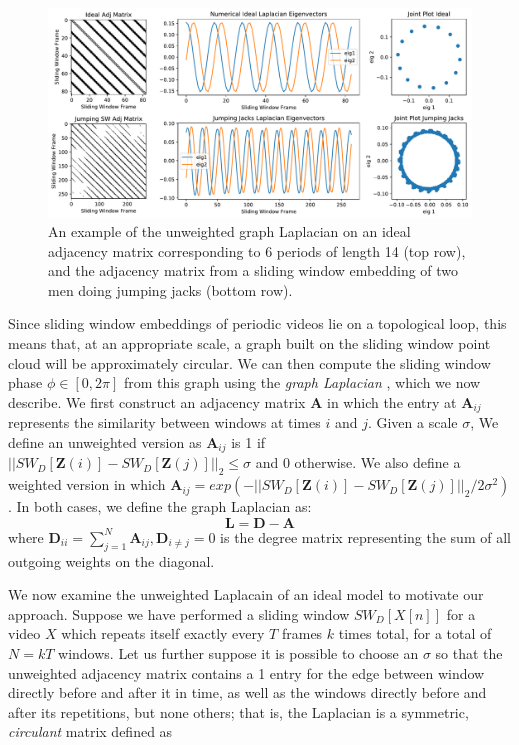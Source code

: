 \documentclass{article}
\newcommand{\mb}{\mathbf}
\begin{document}
\begin{figure}[h!]
\centering
\includegraphics[width=\columnwidth]{CirculantExample.pdf}
\caption{An example of the unweighted graph Laplacian on an ideal adjacency matrix corresponding to 6 periods of length 14 (top row), and the adjacency matrix from a sliding window embedding of two men doing jumping jacks (bottom row).  }
\label{fig:CirculantExample}
\end{figure}

Since sliding window embeddings of periodic videos lie on a topological loop, this means that, at an appropriate scale, a graph built on the sliding window point cloud will be approximately circular.  We can then compute the sliding window phase $\phi \in [0, 2\pi]$ from this graph using the {\em graph Laplacian} \cite{chung1997spectral}, which we now describe. We first construct an adjacency matrix $\mb{A}$ in which the entry at $\mb{A}_{ij}$ represents the similarity between windows at times $i$ and $j$.  Given a scale $\sigma$, We define an unweighted version as $\mb{A}_{ij}$ is 1 if $||SW_{D}[\mb{Z}(i)] - SW_{D}[\mb{Z}(j)]||_2 \leq \sigma$ and 0 otherwise. We also define a weighted version in which $\mb{A}_{ij} = exp(-||SW_{D}[\mb{Z}(i)] - SW_{D}[\mb{Z}(j)]||_2/2\sigma^2)$. In both cases, we define the graph Laplacian as:
\begin{equation}
	\mb{L} = \mb{D}-\mb{A}
\end{equation}
where $\mb{D}_{ii} = \sum_{j = 1}^N \mb{A}_{ij}, \mb{D}_{i \neq j} = 0$ is the degree matrix representing the sum of all outgoing weights on the diagonal.  

We now examine the unweighted Laplacain of an ideal model to motivate our approach.  Suppose we have performed a sliding window $SW_{D}[X[n]]$ for a video $X$ which repeats itself exactly every $T$ frames $k$ times total, for a total of $N = kT$ windows.  Let us further suppose it is possible to choose an $\sigma$ so that the unweighted adjacency matrix contains a 1 entry for the edge between window directly before and after it in time, as well as the windows directly before and after its repetitions, but none others; that is, the Laplacian is a symmetric, {\em circulant} matrix defined as 
\end{document}

